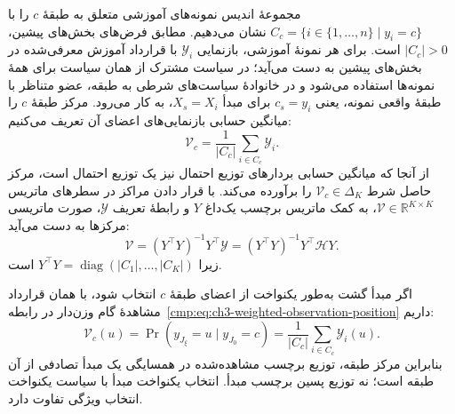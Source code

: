 مجموعهٔ اندیس نمونه‌های آموزشی متعلق به طبقهٔ $c$ را با
$C_c=\{i\in\{1,\ldots,n\}\mid y_i=c\}$ نشان می‌دهیم. مطابق فرض‌های بخش‌های پیشین،
$|C_c|>0$ است.
برای هر نمونهٔ آموزشی، بازنمایی $\mathscr Y_i$
با قرارداد آموزش معرفی‌شده در بخش‌های پیشین به دست می‌آید؛
در سیاست مشترک از همان سیاست برای همهٔ نمونه‌ها استفاده می‌شود
و در خانوادهٔ سیاست‌های شرطی به طبقه، عضو متناظر با طبقهٔ واقعی
نمونه، یعنی $c_s=y_i$ برای مبدأ $X_s=X_i$، به کار می‌رود.
مرکز طبقهٔ $c$ را میانگین حسابی بازنمایی‌های اعضای آن تعریف می‌کنیم:
\begin{equation}\label{cmp:eq:ch3-class-center}
\boxed{\mathcal V_c=\frac{1}{|C_c|}\sum_{i\in C_c}\mathscr Y_i.}
\end{equation}
از آنجا که میانگین حسابی بردارهای توزیع احتمال نیز یک توزیع احتمال است،
مرکز حاصل شرط $\mathcal V_c\in\Delta_K$ را برآورده می‌کند.
با قرار دادن مراکز در سطرهای ماتریس $\mathcal V\in\mathbb R^{K\times K}$،
به کمک ماتریس برچسب یک‌داغ $Y$ و رابطهٔ تعریف $\mathscr Y$،
صورت ماتریسی مرکزها به دست می‌آید:
\begin{equation}\label{cmp:eq:ch3-class-centers-matrix}
\boxed{\mathcal V=(Y^\top Y)^{-1}Y^\top\mathscr Y
=(Y^\top Y)^{-1}Y^\top\mathscr H Y.}
\end{equation}
زیرا $Y^\top Y=\operatorname{diag}(|C_1|,\ldots,|C_K|)$ است.

اگر مبدأ گشت به‌طور یکنواخت از اعضای طبقهٔ $c$ انتخاب شود،
با همان قرارداد مشاهدهٔ گام وزن‌دار در
رابطه~\eqref{cmp:eq:ch3-weighted-observation-position} داریم:
\begin{equation}\label{cmp:eq:ch3-class-center-prob}
\boxed{\mathcal V_c(u)=
\Pr(y_{J_\xi}=u\mid y_{J_0}=c)
=\frac{1}{|C_c|}\sum_{i\in C_c}\mathscr Y_i(u).}
\end{equation}
بنابراین مرکز طبقه، توزیع برچسب مشاهده‌شده در همسایگی
یک مبدأ تصادفی از آن طبقه است؛ نه توزیع پسین برچسب مبدأ.
انتخاب یکنواخت مبدأ با سیاست یکنواخت انتخاب ویژگی تفاوت دارد.

